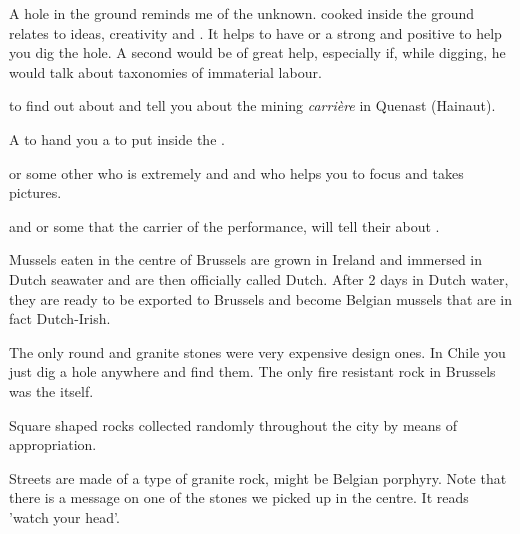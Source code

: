 {{A hole in the ground reminds me of the unknown.  cooked inside the
ground relates to ideas, creativity and . It helps to have
 or a strong and positive  to help you dig the hole. A
second  would be of great help, especially if, while digging, he
would talk about taxonomies of immaterial labour.

\startitemize[3,unpacked]

\item{ to find out about  and tell you
about the mining {\em carri\`ere} in Quenast (Hainaut).} 

\item{A  to hand you a  to put inside the .}

\item{ or some other  who is extremely  and
 and who helps you to focus and takes pictures.}

\item{ and  or some  that  the carrier of the
performance, will tell their  about .} 
\stopitemize

Mussels eaten in the centre of Brussels are grown in Ireland and immersed in
Dutch seawater and are then officially called Dutch. After 2 days in
Dutch water, they are ready to be exported to Brussels and become
Belgian mussels that are in fact Dutch{}-Irish.


The only round and granite stones were very expensive design ones. In Chile you just dig a
hole anywhere and find them. The only fire resistant rock in Brussels
was the  itself.

\startitemize[3,unpacked]

\item{Square shaped rocks collected randomly throughout the city by means of appropriation.}

\stopitemize

Streets are made of a type of granite rock, might be
Belgian porphyry. Note that there is a message on one of the stones we
picked up in the centre. It reads 'watch your
head'.

}}
